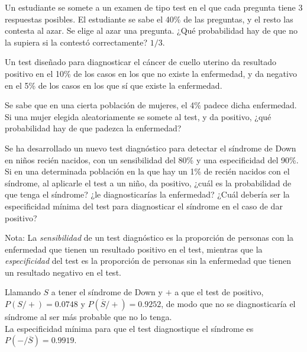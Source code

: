{Un estudiante se somete a un examen de tipo test en el que cada pregunta tiene 3 respuestas posibles.
El estudiante se sabe el 40\% de las preguntas, y el resto las contesta al azar.
Se elige al azar una pregunta.
¿Qué probabilidad hay de que no la supiera si la contestó correctamente?
}
{$1/3$.}
{}


{Un test diseñado para diagnosticar el cáncer de cuello uterino da resultado positivo en el 10\% de los casos en los
que no existe la enfermedad, y da negativo en el 5\% de los casos en los que sí que existe la enfermedad.

Se sabe que en una cierta población de mujeres, el 4\% padece dicha enfermedad.
Si una mujer elegida aleatoriamente se somete al test, y da positivo, ¿qué probabilidad hay de que padezca la
enfermedad?}
{}
{}


{Se ha desarrollado un nuevo test diagnóstico para detectar el síndrome de Down en niños recién nacidos, con un
sensibilidad del 80\% y una especificidad del 90\%.
Si en una determinada población en la que hay un 1\% de recién nacidos con el síndrome, al aplicarle el test a un niño,
da positivo, ¿cuál es la probabilidad de que tenga el síndrome?
¿le diagnosticarías la enfermedad?
¿Cuál debería ser la especificidad mínima del test para diagnosticar el síndrome en el caso de dar positivo?

Nota: La \emph{sensibilidad} de un test diagnóstico es la proporción de personas con la enfermedad que tienen un
resultado positivo en el test, mientras que la \emph{especificidad} del test es la proporción de personas sin la
enfermedad que tienen un resultado negativo en el test.}
{Llamando $S$ a tener el síndrome de Down y $+$ a que el test de positivo, $P(S/+)=0.0748$ y
$P(\overline{S}/+)=0.9252$, de modo que no se diagnosticaría el síndrome al ser más probable que no lo tenga.\\
La especificidad mínima para que el test diagnostique el síndrome es $P(-/\overline{S})=0.9919$.}
{}


